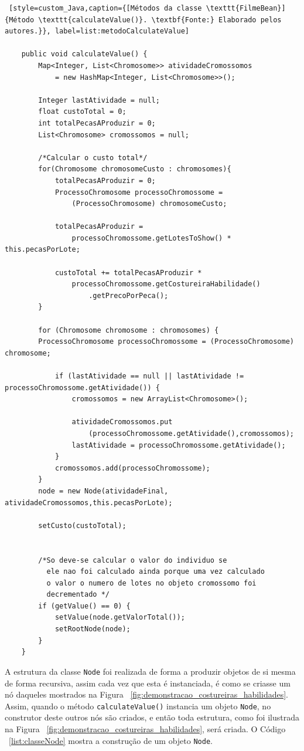 \begin{lstlisting} [style=custom_Java,caption={[Métodos da classe \texttt{FilmeBean}]{Método \texttt{calculateValue()}. \textbf{Fonte:} Elaborado pelos autores.}}, label=list:metodoCalculateValue] 	

	public void calculateValue() {
		Map<Integer, List<Chromosome>> atividadeCromossomos 
			= new HashMap<Integer, List<Chromosome>>();
		
		Integer lastAtividade = null;
		float custoTotal = 0;
		int totalPecasAProduzir = 0;
		List<Chromosome> cromossomos = null;
		
		/*Calcular o custo total*/
		for(Chromosome chromosomeCusto : chromosomes){
			totalPecasAProduzir = 0;
			ProcessoChromosome processoChromossome = 
				(ProcessoChromosome) chromosomeCusto;
				
			totalPecasAProduzir = 
				processoChromossome.getLotesToShow() * this.pecasPorLote;
				
			custoTotal += totalPecasAProduzir * 
				processoChromossome.getCostureiraHabilidade()
					.getPrecoPorPeca();
		}
		
		for (Chromosome chromosome : chromosomes) {
		ProcessoChromosome processoChromossome = (ProcessoChromosome) chromosome;
		
			if (lastAtividade == null || lastAtividade != processoChromossome.getAtividade()) {
				cromossomos = new ArrayList<Chromosome>();
				
				atividadeCromossomos.put
					(processoChromossome.getAtividade(),cromossomos);
				lastAtividade = processoChromossome.getAtividade();
			}
			cromossomos.add(processoChromossome);
		}
		node = new Node(atividadeFinal, atividadeCromossomos,this.pecasPorLote);
		
		setCusto(custoTotal);
		
		
		/*So deve-se calcular o valor do individuo se 
		  ele nao foi calculado ainda porque uma vez calculado 
		  o valor o numero de lotes no objeto cromossomo foi 
		  decrementado */
		if (getValue() == 0) {
			setValue(node.getValorTotal());
			setRootNode(node);
		}
	}

\end{lstlisting}


\par A estrutura da classe \texttt{Node} foi realizada de forma a produzir objetos de si mesma de forma recursiva, assim 
cada vez que esta é instanciada, é como se criasse um nó daqueles
mostrados na Figura ~\ref{fig:demonstracao_costureiras_habilidades}. Assim,
quando o método \texttt{calculateValue()} instancia um objeto \texttt{Node}, no construtor deste outros nós são criados, e então toda
estrutura, como foi ilustrada na Figura
~\ref{fig:demonstracao_costureiras_habilidades}, será criada. O Código
~\ref{list:classeNode} mostra a construção de um objeto \texttt{Node}.


